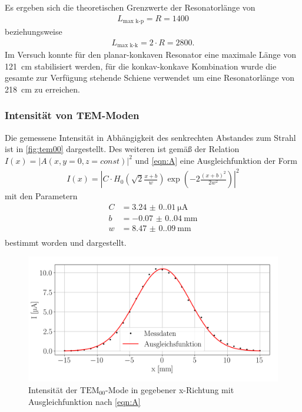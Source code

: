 Es ergeben sich die theoretischen Grenzwerte der Resonatorlänge von 
\begin{align}
    L_\text{max k-p}=R=1400
\end{align}
beziehungsweise 
\begin{align}
    L_\text{max k-k}=2\cdot R=2800\text{.}
\end{align}
Im Versuch konnte für den planar-konkaven Resonator eine maximale Länge von \SI{121}{\centi\meter} stabilisiert werden, für die konkav-konkave Kombination wurde die gesamte zur Verfügung stehende Schiene verwendet um eine Resonatorlänge von \SI{218}{\centi\meter} zu erreichen.
\subsubsection{Intensität von TEM-Moden}
Die gemessene Intensität in Abhängigkeit des senkrechten Abstandes zum Strahl ist in \autoref{fig:tem00} dargestellt. Des weiteren ist gemäß der Relation $I(x)=|A(x,y=0,z=const)|^2$ und \autoref{eqn:A} eine Ausgleichfunktion der Form
\begin{align}
    I(x)=\left|C\cdot H_0\left(\sqrt{2}\frac{x+b}{w}\right)\exp{\left(-2\frac{(x+b)^2}{2w^2}\right)}\right|^2
\end{align}
mit den Parametern
\begin{align}
    C &= \SI{3.24(0.01)}{\micro\ampere}\\
    b &= \SI{-0.07(0.04)}{\milli\meter}\\
    w &= \SI{8.47(0.09)}{\milli\meter}\\
\end{align}
bestimmt worden und dargestellt.
\begin{figure}[H]
    \centering
    \includegraphics[scale=0.55]{Skripte/TEM00Mode.png}
    \caption{Intensität der $\mathrm{TEM_{00}}$-Mode in gegebener x-Richtung mit Ausgleichfunktion nach \autoref{eqn:A}}\label{fig:tem00}
\end{figure}
